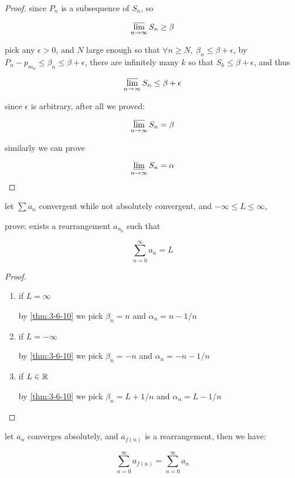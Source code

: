 \begin{proof}
    since $P_{n}$ is a subsequence of $S_n$, so

    \[
        \varlimsup_{n \to \infty}S_n \ge \beta
    \]

    pick any $\epsilon > 0$, and $N$ large enough so that $\forall n \ge N,\: \beta_n \le \beta + \epsilon$, by $P_n - p_{m_n} \le \beta_n \le \beta + \epsilon$,
    there are infinitely many $k$ so that $S_k \le \beta + \epsilon$, and thus
    
    \[
        \varlimsup_{n \to \infty}S_n \le \beta + \epsilon
    \]

    since $\epsilon$ is arbitrary, after all we proved:

    \[
        \varlimsup_{n \to \infty}S_n = \beta
    \]

    similarly we can prove

    \[
        \varliminf_{n \to \infty}S_n = \alpha
    \]

\end{proof}

\begin{thm}
    let $\sum a_n$ convergent while not absolutely convergent, and $-\infty \le L \le \infty$,
    
    prove: exists a rearrangement $a_{n_k}$ such that

    \[
        \sum_{n=0}^{\infty}a_n = L
    \]

\end{thm}

\begin{proof}
    \begin{enumerate}
        \item if $L = \infty$

        by \autoref{thm:3-6-10} we pick $\beta_n = n$ and $\alpha_n = n-1/n$


        \item if $L = -\infty$

        by \autoref{thm:3-6-10} we pick $\beta_n = -n$ and $\alpha_n = -n-1/n$


        \item if $L \in \mathbb{R}$

        by \autoref{thm:3-6-10} we pick $\beta_n = L + 1/n$ and $\alpha_n = L - 1/n$
    \end{enumerate}
\end{proof}

\begin{thm}
    let $a_n$ converges absolutely, and $a_{f(n)}$ is a rearrangement, then we have:

    \[
        \sum_{n=0}^{\infty}a_{f(n)} = \sum_{n=0}^{\infty}a_{n}
    \]
\end{thm}

